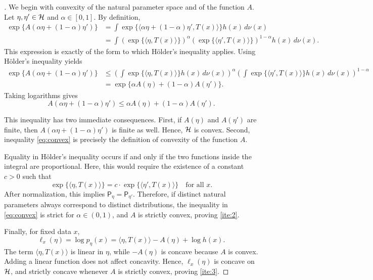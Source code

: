 \begin{proof}[]
We begin with convexity of the natural parameter space and of the function \(A\).
Let \(\eta, \eta' \in \mathcal{H}\) and \(\alpha \in [0,1]\).
By definition,
\begin{align*}
    \exp\{A(\alpha \eta + (1-\alpha)\eta')\}
    &=
    \int
        \exp\{\langle \alpha \eta + (1-\alpha)\eta', T(x) \rangle\}
        h(x)\, d\nu(x) \\
    &=
    \int
        \left( \exp\{\langle \eta, T(x) \rangle\} \right)^{\alpha}
        \left( \exp\{\langle \eta', T(x) \rangle\} \right)^{1-\alpha}
        h(x)\, d\nu(x).
\end{align*}
This expression is exactly of the form to which Hölder's inequality applies.
Using Hölder's inequality yields
\begin{align*}
    \exp\{A(\alpha \eta + (1-\alpha)\eta')\}
    &\le
    \left(
        \int \exp\{\langle \eta, T(x) \rangle\} h(x)\, d\nu(x)
    \right)^{\alpha}
    \left(
        \int \exp\{\langle \eta', T(x) \rangle\} h(x)\, d\nu(x)
    \right)^{1-\alpha} \\
    &=
    \exp\{\alpha A(\eta) + (1-\alpha) A(\eta')\}.
\end{align*}
Taking logarithms gives
\begin{equation}
    \label{eq:convex}
    A(\alpha \eta + (1-\alpha)\eta')
    \le
    \alpha A(\eta) + (1-\alpha) A(\eta').
\end{equation}

This inequality has two immediate consequences.
First, if \(A(\eta)\) and \(A(\eta')\) are finite, then
\(A(\alpha \eta + (1-\alpha)\eta')\) is finite as well.
Hence, \(\mathcal{H}\) is convex.
Second, inequality \eqref{eq:convex} is precisely the definition of convexity of the function
\(A\).

Equality in Hölder's inequality occurs if and only if the two functions inside the integral
are proportional.
Here, this would require the existence of a constant \(c > 0\) such that
\[
    \exp\{\langle \eta, T(x) \rangle\}
    =
    c \cdot \exp\{\langle \eta', T(x) \rangle\}
    \quad \text{for all } x.
\]
After normalization, this implies
\(\mathsf{P}_{\eta} = \mathsf{P}_{\eta'}\).
Therefore, if distinct natural parameters always correspond to distinct distributions,
the inequality in \eqref{eq:convex} is strict for \(\alpha \in (0,1)\), and \(A\) is strictly
convex, proving \ref{ite:2}.

Finally, for fixed data \(x\),
\[
    \ell_x(\eta)
    =
    \log p_{\eta}(x)
    =
    \langle \eta, T(x) \rangle - A(\eta) + \log h(x).
\]
The term \(\langle \eta, T(x) \rangle\) is linear in \(\eta\), while \(-A(\eta)\) is concave
because \(A\) is convex.
Adding a linear function does not affect concavity.
Hence, \(\ell_x(\eta)\) is concave on \(\mathcal{H}\), and strictly concave whenever \(A\) is
strictly convex, proving \ref{ite:3}.
\end{proof}

